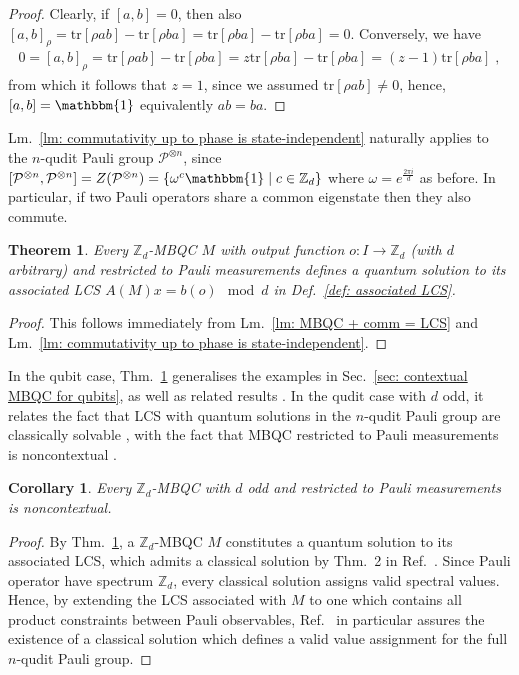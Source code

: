 \documentclass[aps,pra,letterpaper,onrcolumn,nofootinbib,notitlepage,longbibliography]{revtex4-1}
\newtheorem{theorem}{Theorem}
\newtheorem{corollary}{Corollary}
\newcommand{\tr}{\mathrm{tr}}
\newcommand{\one}{\mathbbm{1}}
\newcommand{\ra}{\ensuremath{\rightarrow}}
\newcommand{\zz}{\mathbb Z}
\newcommand\mc[1]{\mathcal{#1}}
\newcommand{\cP}{\mc{P}}
\begin{document}
\begin{proof}
    Clearly, if $[a,b]=0$, then also $[a,b]_\rho=\tr[\rho ab]-\tr[\rho ba]=\tr[\rho ba]-\tr[\rho ba]=0$. Conversely, we have
    \begin{align*}
        0=[a,b]_\rho
        =\tr[\rho ab]-\tr[\rho ba]
        =z\tr[\rho ba]-\tr[\rho ba]
        =(z-1)\tr[\rho ba]\; ,
    \end{align*}
    from which it follows that $z=1$, since we assumed $\tr[\rho ab]\neq 0$, hence, $[a,b]=\one$ equivalently $ab=ba$.
\end{proof}

Lm.~\ref{lm: commutativity up to phase is state-independent} naturally applies to the $n$-qudit Pauli group $\cP^{\otimes n}$, since $[\cP^{\otimes n},\cP^{\otimes n}]=Z(\cP^{\otimes n})=\{\omega^c\one\mid c\in\zz_d\}$ where $\omega=e^{\frac{2\pi i}{d}}$ as before. In particular, if two Pauli operators share a common eigenstate then they also commute.

\begin{theorem}\label{thm: LCS = MBQC for Paulis}
    Every $\zz_d$-MBQC $M$ with output function $o:I\ra\zz_d$ (with $d$ arbitrary) and restricted to Pauli measurements defines a quantum solution to its associated LCS $A(M)x=b(o)\mod d$ in Def.~\ref{def: associated LCS}.
\end{theorem}

\begin{proof}
    This follows immediately from Lm.~\ref{lm: MBQC + comm = LCS} and Lm.~\ref{lm: commutativity up to phase is state-independent}.
\end{proof}

In the qubit case, Thm.~\ref{thm: LCS = MBQC for Paulis} generalises the examples in Sec.~\ref{sec: contextual MBQC for qubits}, as well as related results \cite{Arkhipov2012,TrandafirLisonekCabello2022,MullerGiorgetti2025}. In the qudit case with $d$ odd, it relates the fact that LCS with quantum solutions in the $n$-qudit Pauli group are classically solvable \cite{QassimWallman2020}, with the fact that MBQC restricted to Pauli measurements is noncontextual \cite{Gross2006}.

\begin{corollary}\label{cor: qudit Pauli MBQC}
    Every $\zz_d$-MBQC with $d$ odd and restricted to Pauli measurements is noncontextual.
\end{corollary}

\begin{proof}
    By Thm.~\ref{thm: LCS = MBQC for Paulis}, a $\zz_d$-MBQC $M$ constitutes a quantum solution to its associated LCS, which admits a classical solution by Thm.~2 in Ref.~\cite{QassimWallman2020}. Since Pauli operator have spectrum $\zz_d$, every classical solution assigns valid spectral values. Hence, by extending the LCS associated with $M$ to one which contains all product constraints between Pauli observables, Ref.~\cite{QassimWallman2020} in particular assures the existence of a classical solution which defines a valid value assignment for the full $n$-qudit Pauli group.
\end{proof}
\end{document}
